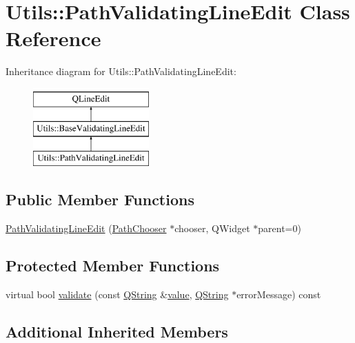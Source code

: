 \hypertarget{class_utils_1_1_path_validating_line_edit}{\section{Utils\-:\-:Path\-Validating\-Line\-Edit Class Reference}
\label{class_utils_1_1_path_validating_line_edit}
}
Inheritance diagram for Utils\-:\-:Path\-Validating\-Line\-Edit\-:\begin{figure}[H]
\begin{center}
\leavevmode
\includegraphics[height=3.000000cm]{class_utils_1_1_path_validating_line_edit}
\end{center}
\end{figure}
\subsection*{Public Member Functions}
\begin{DoxyCompactItemize}
\item 
\hyperlink{class_utils_1_1_path_validating_line_edit_af092de8965e280b10c969024b69fce7b}{Path\-Validating\-Line\-Edit} (\hyperlink{class_utils_1_1_path_chooser}{Path\-Chooser} $\ast$chooser, Q\-Widget $\ast$parent=0)
\end{DoxyCompactItemize}
\subsection*{Protected Member Functions}
\begin{DoxyCompactItemize}
\item 
virtual bool \hyperlink{class_utils_1_1_path_validating_line_edit_a11d7ce87a39a5709cc41bce1e602cb46}{validate} (const \hyperlink{group___u_a_v_objects_plugin_gab9d252f49c333c94a72f97ce3105a32d}{Q\-String} \&\hyperlink{glext_8h_aa0e2e9cea7f208d28acda0480144beb0}{value}, \hyperlink{group___u_a_v_objects_plugin_gab9d252f49c333c94a72f97ce3105a32d}{Q\-String} $\ast$error\-Message) const 
\end{DoxyCompactItemize}
\subsection*{Additional Inherited Members}


